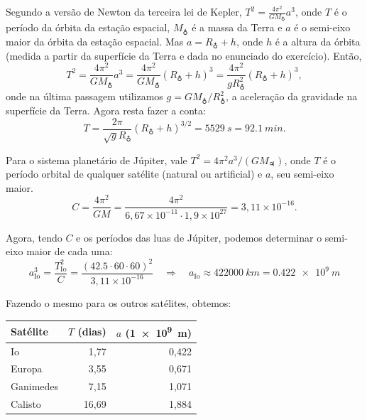 \documentclass[a4paper]{article}
\newcommand\myrightarrow{\quad\Rightarrow\quad}
\begin{document}
\begin{resolucoes}
\begin{exercicio}
\begin{compactenum}[(a)]
  \end{compactenum}
  \end{exercicio}
  
  \begin{exercicio}
   Segundo a versão de Newton da terceira lei de Kepler, $T^2 = \frac{4\pi^2}{GM_{\earth}}a^3$, onde $T$ é o período da órbita da estação espacial, $M_{\earth}$ é a massa da Terra e $a$ é o semi-eixo maior da órbita da estação espacial.
  Mas $a = R_{\earth} + h$, onde $h$ é a altura da órbita (medida a partir da superfície da Terra e dada no enunciado do exercício).
  Então,
  \begin{equation*}
  T^2 = \frac{4\pi^2}{GM_{\earth}} a^3 = \frac{4\pi^2}{GM_{\earth}} \left(R_{\earth} + h\right)^3 = \frac{4\pi^2}{gR_{\earth}^2} \left(R_{\earth} + h\right)^3,
  \end{equation*}
  onde na última passagem utilizamos $g = GM_{\earth}/R_{\earth}^2$, a aceleração da gravidade na superfície da Terra.
  Agora resta fazer a conta:
  \begin{equation*}
  T = \frac{2\pi}{\sqrt{g}R_{\earth}}\left(R_{\earth}+h\right)^{3/2} = \SI{5529}{s} = \SI{92.1}{min}.
  \end{equation*}
  \end{exercicio}
  
  \begin{exercicio*}
  \label{ex:Io_cia} Para o sistema planetário de Júpiter, vale $T^2 = 4\pi^2 a^3/\left(GM_{\jupiter}\right)$, onde $T$ é o período orbital de qualquer satélite (natural ou artificial) e $a$, seu semi-eixo maior.
  \begin{equation*}
  C = \frac{4\pi^2}{GM} = \frac{4\pi^2}{6,67\times10^{-11}\cdot 1,9\times10^{27}} = 3,11\times10^{-16}.
  \end{equation*}
  
  Agora, tendo $C$ e os períodos das luas de Júpiter, podemos determinar o semi-eixo maior de cada uma:
  \begin{equation*}
  a_{\text{Io}}^3 = \frac{T_{\text{Io}}^2}{C} = \frac{\left(42.5\cdot 60\cdot 60\right)^2}{3,11\times10^{-16}} \myrightarrow a_{\text{Io}} \approx \SI{422000}{km} = \SI{0.422e9}{m}
  \end{equation*}
  
  Fazendo o mesmo para os outros satélites, obtemos:
  
  \begin{center}
    \begin{tabular}{lrr}
    \toprule
    Satélite  & $T$ (dias) & $a$ (\SI{1e9}{m}) \\
    \midrule
    Io        &  1,77      & 0,422 \\
    Europa    &  3,55      & 0,671 \\
    Ganimedes &  7,15      & 1,071 \\
    Calisto   & 16,69      & 1,884 \\
    \bottomrule
    \end{tabular}
  \end{center}
  

\end{exercicio*}
\end{resolucoes}
\end{document}
